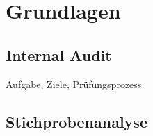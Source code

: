 \chapter{Grundlagen}

\section{Internal Audit}
Aufgabe, Ziele, Prüfungsprozess

\section{Stichprobenanalyse}